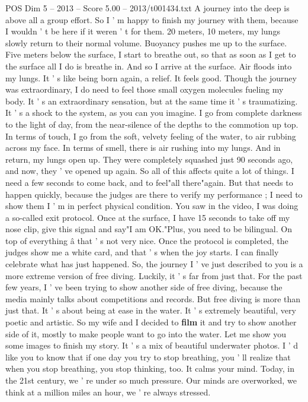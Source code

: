 \begin{textsample}{POS Dim 5 – 2013 – Score 5.00 – 2013/t001434.txt}
A journey into the deep is above all a group effort.
So I ' m happy to finish my journey with them, because I wouldn ' t be here if it weren ' t for them. 20 meters, 10 meters, my lungs slowly return to their normal volume.
Buoyancy pushes me up to the surface.
Five meters below the surface, I start to breathe out, so that as soon as I get to the surface all I do is breathe in.
And so I arrive at the surface.
Air floods into my lungs.
It ' s like being born again, a relief.
It feels good.
Though the journey was extraordinary, I do need to feel those small oxygen molecules fueling my body.
It ' s an extraordinary sensation, but at the same time it ' s traumatizing.
It ' s a shock to the system, as you can you imagine.
I go from complete darkness to the light of day, from the near-silence of the depths to the commotion up top.
In terms of touch, I go from the soft, velvety feeling of the water, to air rubbing across my face.
In terms of smell, there is air rushing into my lungs.
And in return, my lungs open up.
They were completely squashed just 90 seconds ago, and now, they ' ve opened up again.
So all of this affects quite a lot of things.
I need a few seconds to come back, and to feel"all there"again.
But that needs to happen quickly, because the judges are there to verify my performance ; I need to show them I ' m in perfect physical condition.
You saw in the video, I was doing a so-called exit protocol.
Once at the surface, I have 15 seconds to take off my nose clip, give this signal and say"I am OK."Plus, you need to be bilingual.
On top of everything â that ' s not very nice.
Once the protocol is completed, the judges show me a white card, and that ' s when the joy starts.
I can finally celebrate what has just happened.
So, the journey I ' ve just described to you is a more extreme version of free diving.
Luckily, it ' s far from just that.
For the past few years, I ' ve been trying to show another side of free diving, because the media mainly talks about competitions and records.
But free diving is more than just that.
It ' s about being at ease in the water.
It ' s extremely beautiful, very poetic and artistic.
So my wife and I decided to \textbf{film} it and try to show another side of it, mostly to make people want to go into the water.
Let me show you some images to finish my story.
It ' s a mix of beautiful underwater photos.
I ' d like you to know that if one day you try to stop breathing, you ' ll realize that when you stop breathing, you stop thinking, too.
It calms your mind.
Today, in the 21st century, we ' re under so much pressure.
Our minds are overworked, we think at a million miles an hour, we ' re always stressed.

\end{textsample}
